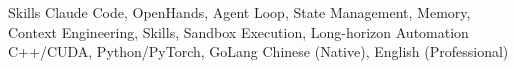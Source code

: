 
\begin{rubric}{Skills}
\entry*[AI Agent]
	Claude Code, OpenHands, Agent Loop, State Management, Memory, Context Engineering, Skills, Sandbox Execution, Long-horizon Automation
\entry*[Programming]
	C++/CUDA, Python/PyTorch, GoLang
\entry*[Languages]
	Chinese (Native), English (Professional)
\end{rubric}
